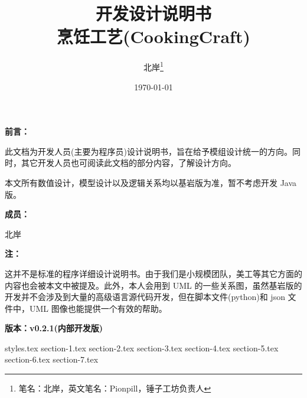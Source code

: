 \documentclass{PionpillNote-book}
\title{\Huge{开发设计说明书} \\ \large{烹饪工艺(CookingCraft)}}
\author{
    北岸\footnote{笔名：北岸，英文笔名：Pionpill，锤子工坊负责人}
}
\date{\today}
\begin{document}
\maketitle                  %

\vspace{2cm}
\noindent\textbf{前言：}

此文档为开发人员(主要为程序员)设计说明书，旨在给予模组设计统一的方向。同时，其它开发人员也可阅读此文档的部分内容，了解设计方向。

本文所有数值设计，模型设计以及逻辑关系均以基岩版为准，暂不考虑开发 Java 版。

\noindent\textbf{成员：}

北岸

\noindent\textbf{注：}

这并不是标准的程序详细设计说明书。由于我们是小规模团队，美工等其它方面的内容也会被本文中被提及。此外，本人会用到 UML 的一些关系图，虽然基岩版的开发并不会涉及到大量的高级语言源代码开发，但在脚本文件(python)和 json 文件中，UML 图像也能提供一个有效的帮助。

\hfill \textbf{版本：v0.2.1(内部开发版)}


\newpage
\tableofcontents            %
\thispagestyle{empty}
\newpage
\setcounter{page}{1}

{styles.tex}
{section-1.tex}
{section-2.tex}
{section-3.tex}
{section-4.tex}
{section-5.tex}
{section-6.tex}
{section-7.tex}

\end{document}
